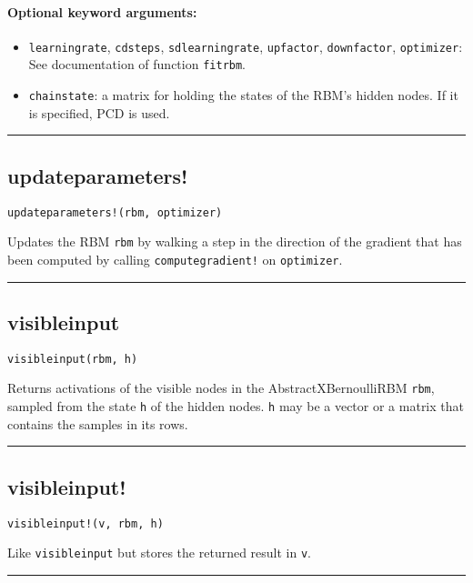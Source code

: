 \paragraph*{Optional keyword arguments:}
\begin{itemize}
\item \texttt{learningrate}, \texttt{cdsteps}, \texttt{sdlearningrate}, \texttt{upfactor}, \texttt{downfactor},  \texttt{optimizer}:  See documentation of function \texttt{fitrbm}.


\item \texttt{chainstate}: a matrix for holding the states of the RBM's hidden nodes. If  it is specified, PCD is used.

\end{itemize}
\noindent\rule{\textwidth}{1pt}
\subsection*{updateparameters!}
\begin{verbatim}
updateparameters!(rbm, optimizer)
\end{verbatim}
Updates the RBM \texttt{rbm} by walking a step in the direction of the gradient that has been computed by calling \texttt{computegradient!} on \texttt{optimizer}.

\noindent\rule{\textwidth}{1pt}
\subsection*{visibleinput}
\begin{verbatim}
visibleinput(rbm, h)
\end{verbatim}
Returns activations of the visible nodes in the AbstractXBernoulliRBM \texttt{rbm}, sampled from the state \texttt{h} of the hidden nodes. \texttt{h} may be a vector or a matrix that contains the samples in its rows.

\noindent\rule{\textwidth}{1pt}
\subsection*{visibleinput!}
\begin{verbatim}
visibleinput!(v, rbm, h)
\end{verbatim}
Like \texttt{visibleinput} but stores the returned result in \texttt{v}.

\noindent\rule{\textwidth}{1pt}
